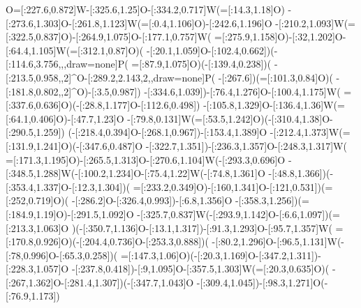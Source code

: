 O=[:227.6,0.872]W-[:325.6,1.25]O-[:334.2,0.717]W(=[:14.3,1.18]O)%
-[:273.6,1.303]O-[:261.8,1.123]W(=[:0.4,1.106]O)-[:242.6,1.196]O%
-[:210.2,1.093]W(=[:322.5,0.837]O)-[:264.9,1.075]O-[:177.1,0.757]W(%
=[:275.9,1.158]O)-[:32,1.202]O-[:64.4,1.105]W(=[:312.1,0.87]O)(%
-[:20.1,1.059]O-[:102.4,0.662]\phantom{W})(-[:114.6,3.756,,,draw=none]P(%
=[:87.9,1.075]O)(-[:139.4,0.238])(%
-[:213.5,0.958,,2]^{\mcfminus}O-[:289.2,2.143,2,,draw=none]P(%
-[:267.6])(=[:101.3,0.84]O)(%
-[:181.8,0.802,,2]^{\mcfminus}O)-[:3.5,0.987])%
-[:334.6,1.039])-[:76.4,1.276]O-[:100.4,1.175]W(%
=[:337.6,0.636]O)(-[:28.8,1.177]O-[:112.6,0.498]\phantom{W})%
-[:105.8,1.329]O-[:136.4,1.36]W(=[:64.1,0.406]O)-[:47.7,1.23]O%
-[:79.8,0.131]W(=[:53.5,1.242]O)(-[:310.4,1.38]O-[:290.5,1.259]\phantom{W})%
(-[:218.4,0.394]O-[:268.1,0.967]\phantom{W})-[:153.4,1.389]O%
-[:212.4,1.373]W(=[:131.9,1.241]O)(-[:347.6,0.487]O%
-[:322.7,1.351]\phantom{W})-[:236.3,1.357]O-[:248.3,1.317]W(%
=[:171.3,1.195]O)-[:265.5,1.313]O-[:270.6,1.104]W(-[:293.3,0.696]O%
-[:348.5,1.288]W(-[:100.2,1.234]O-[:75.4,1.22]W(-[:74.8,1.361]O%
-[:48.8,1.366]\phantom{W})(-[:353.4,1.337]O-[:12.3,1.304]\phantom{W})(%
=[:233.2,0.349]O)-[:160,1.341]O-[:121,0.531]\phantom{W})(=[:252,0.719]O)(%
-[:286.2]O-[:326.4,0.993]\phantom{W})-[:6.8,1.356]O%
-[:358.3,1.256]\phantom{W})(=[:184.9,1.19]O)-[:291.5,1.092]O%
-[:325.7,0.837]W(-[:293.9,1.142]O-[:6.6,1.097]\phantom{W})(=[:213.3,1.063]O%
)(-[:350.7,1.136]O-[:13.1,1.317]\phantom{W})-[:91.3,1.293]O-[:95.7,1.357]W(%
=[:170.8,0.926]O)(-[:204.4,0.736]O-[:253.3,0.888]\phantom{W})(%
-[:80.2,1.296]O-[:96.5,1.131]W(-[:78,0.996]O-[:65.3,0.258]\phantom{W})(%
=[:147.3,1.06]O)(-[:20.3,1.169]O-[:347.2,1.311]\phantom{W})-[:228.3,1.057]O%
-[:237.8,0.418]\phantom{W})-[:9,1.095]O-[:357.5,1.303]W(=[:20.3,0.635]O)(%
-[:267,1.362]O-[:281.4,1.307]\phantom{W})(-[:347.7,1.043]O%
-[:309.4,1.045]\phantom{W})-[:98.3,1.271]O(-[:76.9,1.173]\phantom{W})
